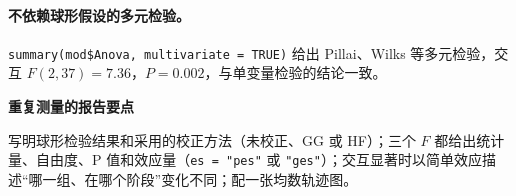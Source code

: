 \paragraph{不依赖球形假设的多元检验。}\Verb|summary(mod$Anova, multivariate = TRUE)| 给出 Pillai、Wilks 等多元检验，交互 $F(2,37)=7.36$，$P=0.002$，与单变量检验的结论一致。


\begin{studyreview}
\textbf{重复测量的报告要点}


写明球形检验结果和采用的校正方法（未校正、GG 或 HF）；三个 $F$ 都给出统计量、自由度、P 值和效应量（\Verb|es = "pes"| 或 \Verb|"ges"|）；交互显著时以简单效应描述“哪一组、在哪个阶段”变化不同；配一张均数轨迹图。

\end{studyreview}
